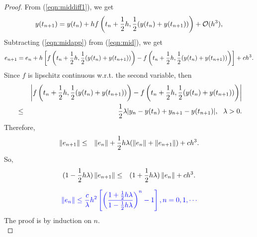 \documentclass[12pt]  {article}%
\begin{document}
\begin{proof}
From (\ref{eqn:middiff1}), we get
 \begin{eqnarray}\label{eqn:midapp}
 y(t_{n+1})=y(t_n)+h f\left(t_n+\frac{1}{2}h,\frac{1}{2}(y(t_n)+y(t_{n+1}))\right)+\mathcal{O}{(h^3)},
\end{eqnarray}
Subtracting (\ref{eqn:midapp}) from (\ref{eqn:mid}), we get
 \begin{eqnarray}\label{eqn:feulerdiff}
 e_{n+1}=e_{n}+h \left[f\left(t_n+\frac{1}{2}h,\frac{1}{2}(y(t_n)+y(t_{n+1}))\right)-   f\left(t_n+\frac{1}{2}h,\frac{1}{2}(y(t_n)+y(t_{n+1}))\right)  \right]+ch^3.
\end{eqnarray}
Since $f$ is lipschitz continuous w.r.t. the second variable, then
 \begin{eqnarray}
&&\left |f\left(t_n+\frac{1}{2}h,\frac{1}{2}(y(t_n)+y(t_{n+1}))\right)-   f\left(t_n+\frac{1}{2}h,\frac{1}{2}(y(t_n)+y(t_{n+1}))\right)\right | \nonumber\\
&\leq&\frac{1}{2} \lambda |y_n-y(t_n)+y_{n+1}-y(t_{n+1})|,~~\lambda>0.
\end{eqnarray}
Therefore,
 \begin{eqnarray}
 \left\|e_{n+1}\right\|&\leq& \left\|e_n\right\|+\frac{1}{2}h\lambda(\left\|e_n\right\|+\left\|e_{n+1}\right\|)+ch^3.
\end{eqnarray}
So,
 \begin{eqnarray}
 (1-\frac{1}{2}h\lambda)\left\|e_{n+1}\right\|&\leq&(1+\frac{1}{2}h\lambda) \left\|e_n\right\|+ch^3.
\end{eqnarray}

\begin{eqnarray}\label{eqn:claimmid}
\textcolor{blue}{\left\|e_n\right\| \leq \frac{c}{\lambda}h^2\left[\left(\frac{1+\frac{1}{2}h\lambda}{1-\frac{1}{2}h\lambda}\right)^n-1\right], n=0,1,\cdots}
\end{eqnarray}
The proof is by induction on $n$.\\


\end{proof}
\end{document}
